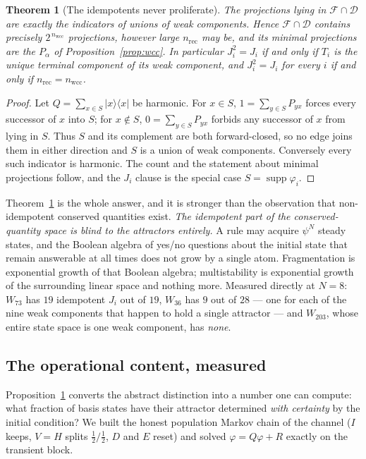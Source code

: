 \documentclass[11pt]{article}
\theoremstyle{plain}
\newtheorem{theorem}{Theorem}
\theoremstyle{definition}
\theoremstyle{remark}
\begin{document}
\begin{theorem}[The idempotents never proliferate]
\label{prop:idem}
The projections lying in $\mathcal{F} \cap \mathcal{D}$ are exactly the
indicators of unions of weak components. Hence $\mathcal{F} \cap \mathcal{D}$
contains precisely $2^{\,n_{\mathrm{wcc}}}$ projections, however large
$n_{\mathrm{rec}}$ may be, and its minimal projections are the $P_\alpha$ of
Proposition~\ref{prop:wcc}. In particular $J_i^2 = J_i$ if and only if $T_i$ is
the unique terminal component of its weak component, and $J_i^2 = J_i$ for
\emph{every} $i$ if and only if $n_{\mathrm{rec}} = n_{\mathrm{wcc}}$.
\end{theorem}

\begin{proof}
Let $Q = \sum_{x \in S} |x\rangle\langle x|$ be harmonic. For $x \in S$,
$1 = \sum_{y \in S} P_{yx}$ forces every successor of $x$ into $S$; for
$x \notin S$, $0 = \sum_{y\in S} P_{yx}$ forbids any successor of $x$ from
lying in $S$. Thus $S$ and its complement are both forward-closed, so no edge
joins them in either direction and $S$ is a union of weak components.
Conversely every such indicator is harmonic. The count and the statement about
minimal projections follow, and the $J_i$ clause is the special case
$S = \operatorname{supp}\varphi_i$.
\end{proof}

\noindent Theorem~\ref{prop:idem} is the whole answer, and it is stronger than
the observation that non-idempotent conserved quantities exist. \emph{The
idempotent part of the conserved-quantity space is blind to the attractors
entirely.} A rule may acquire $\psi^N$ steady states, and the Boolean algebra of
yes/no questions about the initial state that remain answerable at all times
does not grow by a single atom. Fragmentation is exponential growth of that
Boolean algebra; multistability is exponential growth of the surrounding linear
space and nothing more. Measured directly at $N=8$: $W_{73}$ has $19$
idempotent $J_i$ out of $19$, $W_{36}$ has $9$ out of $28$ --- one for each of
the nine weak components that happen to hold a single attractor --- and
$W_{203}$, whose entire state space is one weak component, has \emph{none}.

\subsection{The operational content, measured}
\label{sec:measured}

Proposition~\ref{prop:idem} converts the abstract distinction into a number one
can compute: what fraction of basis states have their attractor determined
\emph{with certainty} by the initial condition? We built the honest population
Markov chain of the channel ($I$ keeps, $V=H$ splits $\tfrac12/\tfrac12$, $D$
and $E$ reset) and solved $\varphi = Q\varphi + R$ exactly on the transient
block.
\end{document}
